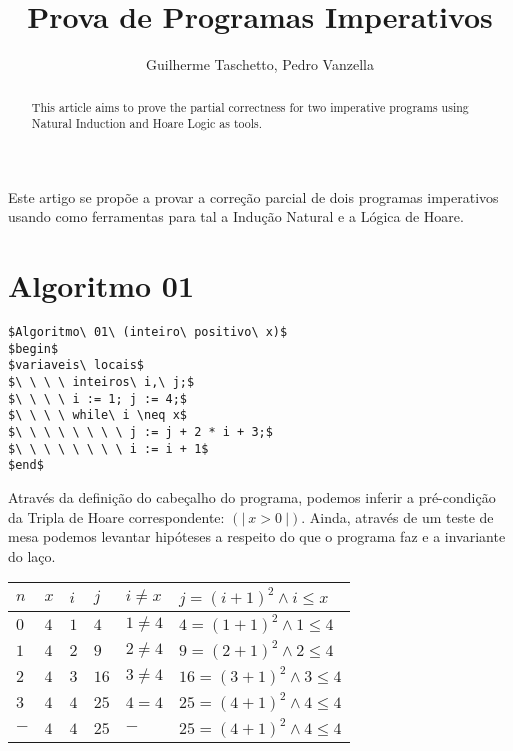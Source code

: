 \documentclass[12pt]{article}
\title{Prova de Programas Imperativos}
\author{Guilherme Taschetto\inst{1}, Pedro Vanzella\inst{1}}
\begin{document}
\maketitle

\begin{abstract}
    This article aims to prove the partial correctness for two imperative programs
    using Natural Induction and Hoare Logic as tools.
\end{abstract}

\begin{resumo}
    Este artigo se propõe a provar a correção parcial de dois programas imperativos
    usando como ferramentas para tal a Indução Natural e a Lógica de Hoare.
\end{resumo}

\section{Algoritmo 01}\label{sec:algo1}
\begin{lstlisting}
$Algoritmo\ 01\ (inteiro\ positivo\ x)$
$begin$
$variaveis\ locais$
$\ \ \ \ inteiros\ i,\ j;$
$\ \ \ \ i := 1; j := 4;$
$\ \ \ \ while\ i \neq x$
$\ \ \ \ \ \ \ \ j := j + 2 * i + 3;$
$\ \ \ \ \ \ \ \ i := i + 1$
$end$
\end{lstlisting}

Através da definição do cabeçalho do programa, podemos inferir a pré-condição da Tripla de Hoare correspondente: $(|\ x > 0\ |)$. Ainda, através de um teste de
mesa podemos levantar hipóteses a respeito do que o programa faz e a invariante do laço.

\begin{table}[h]
\begin{tabular}{|l|l|l|l|l|l|}
\hline
$n$ & $x$ & $i$ & $j $ & $i \neq x$ & $j=(i+1)^2 \land i \leq x $ \\ \hline
$0$ & $4$ & $1$ & $4 $ & $1 \neq 4$ & $4=(1+1)^2 \land 1 \leq 4 $ \\ \hline
$1$ & $4$ & $2$ & $9 $ & $2 \neq 4$ & $9=(2+1)^2 \land 2 \leq 4 $ \\ \hline
$2$ & $4$ & $3$ & $16$ & $3 \neq 4$ & $16=(3+1)^2 \land 3 \leq 4$ \\ \hline
$3$ & $4$ & $4$ & $25$ & $4 = 4   $ & $25=(4+1)^2 \land 4 \leq 4$ \\ \hline
$-$ & $4$ & $4$ & $25$ & $-       $ & $25=(4+1)^2 \land 4 \leq 4$ \\ \hline
\end{tabular}
\end{table}
\end{document}
